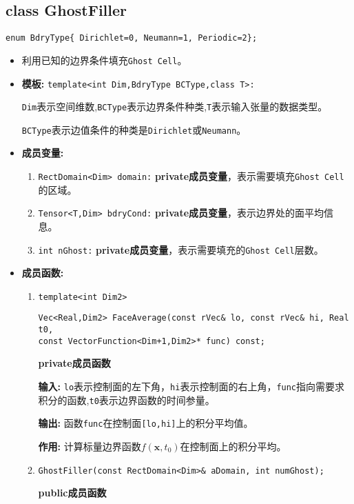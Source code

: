 \documentclass[UTF8]{ctexart}
\theoremstyle{plain}
\theoremstyle{definition}
\theoremstyle{remark}
\begin{document}
\subsection{class GhostFiller}
\texttt{enum BdryType\{ Dirichlet=0, Neumann=1, Periodic=2\};}
\begin{itemize}
    \item 利用已知的边界条件填充\texttt{Ghost Cell}。
    \item \textbf{模板:} \texttt{template<int Dim,BdryType BCType,class T>:}
    
    \texttt{Dim}表示空间维数,\texttt{BCType}表示边界条件种类,\texttt{T}表示输入张量的数据类型。

    \texttt{BCType}表示边值条件的种类是\texttt{Dirichlet}或\texttt{Neumann}。
    \item \textbf{成员变量:}
    \begin{enumerate}
        \item \texttt{RectDomain<Dim> domain:} \textbf{private成员变量}，表示需要填充\texttt{Ghost Cell}的区域。
        \item \texttt{Tensor<T,Dim> bdryCond:} \textbf{private成员变量}，表示边界处的面平均信息。
        \item \texttt{int nGhost:} \textbf{private成员变量}，表示需要填充的\texttt{Ghost Cell}层数。
    \end{enumerate}
    \item \textbf{成员函数:}
    \begin{enumerate}
        \item \texttt{template<int Dim2>}
        
        \texttt{Vec<Real,Dim2> FaceAverage(const rVec\& lo, const rVec\& hi, Real t0, \\const VectorFunction<Dim+1,Dim2>* func) const;}
        
        \textbf{private成员函数}

        \textbf{输入:} \texttt{lo}表示控制面的左下角，\texttt{hi}表示控制面的右上角，\texttt{func}指向需要求积分的函数,\texttt{t0}表示边界函数的时间参量。

        \textbf{输出:} 函数\texttt{func}在控制面\texttt{[lo,hi]}上的积分平均值。

        \textbf{作用:} 计算标量边界函数$f(\mathbf{x},t_{0})$在控制面上的积分平均。

        \item \texttt{GhostFiller(const RectDomain<Dim>\& aDomain, int numGhost);}
        
        \textbf{public成员函数}


\end{enumerate}
\end{itemize}
\end{document}
